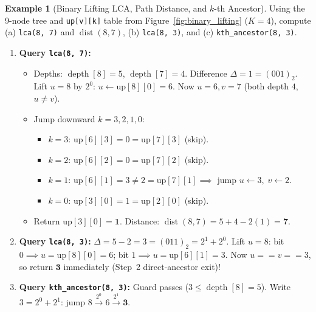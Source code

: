 \documentclass[11pt,a4paper]{article}
\theoremstyle{definition}
\newtheorem{example}{Example}[section]
\begin{document}
\begin{example}[Binary Lifting LCA, Path Distance, and $k$-th Ancestor]
Using the 9-node tree and \texttt{up[v][k]} table from Figure~\ref{fig:binary_lifting} ($K = 4$), compute (a) \texttt{lca(8, 7)} and $\operatorname{dist}(8, 7)$, (b) \texttt{lca(8, 3)}, and (c) \texttt{kth\_ancestor(8, 3)}.
\begin{enumerate}
    \item \textbf{Query \texttt{lca(8, 7)}:}
    \begin{itemize}[itemsep=1pt, topsep=2pt]
        \item Depths: $\operatorname{depth}[8] = 5$, $\operatorname{depth}[7] = 4$. Difference $\Delta = 1 = (001)_2$. Lift $u = 8$ by $2^0$: $u \gets \text{up}[8][0] = 6$. Now $u = 6, v = 7$ (both depth $4$, $u \ne v$).
        \item Jump downward $k = 3, 2, 1, 0$:
        \begin{itemize}[itemsep=1pt, topsep=1pt]
            \item $k = 3$: $\text{up}[6][3] = 0 = \text{up}[7][3]$ (skip).
            \item $k = 2$: $\text{up}[6][2] = 0 = \text{up}[7][2]$ (skip).
            \item $k = 1$: $\text{up}[6][1] = 3 \ne 2 = \text{up}[7][1] \implies$ jump $u \gets 3,\; v \gets 2$.
            \item $k = 0$: $\text{up}[3][0] = 1 = \text{up}[2][0]$ (skip).
        \end{itemize}
        \item Return $\text{up}[3][0] = \mathbf{1}$. Distance: $\operatorname{dist}(8, 7) = 5 + 4 - 2(1) = \mathbf{7}$.
    \end{itemize}
    \item \textbf{Query \texttt{lca(8, 3)}:} $\Delta = 5 - 2 = 3 = (011)_2 = 2^1 + 2^0$. Lift $u = 8$: bit $0 \implies u = \text{up}[8][0] = 6$; bit $1 \implies u = \text{up}[6][1] = 3$. Now $u == v == 3$, so return $\mathbf{3}$ immediately (Step~2 direct-ancestor exit)!
    \item \textbf{Query \texttt{kth\_ancestor(8, 3)}:} Guard passes ($3 \le \operatorname{depth}[8] = 5$). Write $3 = 2^0 + 2^1$: jump $8 \xrightarrow{2^0} 6 \xrightarrow{2^1} \mathbf{3}$.
\end{enumerate}
\end{example}
\end{document}
